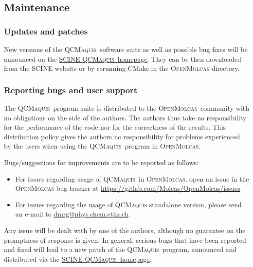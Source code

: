 \documentclass[bibliography=totoc,12pt,a4paper]{scrartcl}
\newcommand{\mol}{\textsc{OpenMolcas}}
\newcommand{\qcm}{\textsc{QCMaquis}}
\begin{document}
\subsection{Maintenance}\label{sec:maintenance}

\subsubsection{Updates and patches}\label{sec:patches-qcm}

New versions of the \qcm\ software suite as well as possible bug fixes will be announced
on the \href{https://www.scine.ethz.ch/download/qcmaquis}{SCINE \qcm\ homepage}. They can be then downloaded from the SCINE website or by rerunning CMake in the \mol{} directory.

\subsubsection{Reporting bugs and user support}\label{sec:bugs-support}

The \qcm\ program suite is distributed to the \mol\ community with no obligations on the side of the authors.
The authors thus take no responsibility for the performance of the code nor for the correctness of the results.
This distribution policy gives the authors no responsibility for problems experienced by the users when using the \qcm\ program in \mol.

Bugs/suggestions for improvements are to be reported as follows:

\begin{itemize}
  \item For issues regarding usage of \qcm\ in \mol{}, open an issue in the \mol{} bug tracker at
    \url{https://gitlab.com/Molcas/OpenMolcas/issues}
  \item For issues regarding the usage of \qcm{} standalone version, please send an e-mail to \href{mailto:dmrg@phys.chem.ethz.ch}{dmrg@phys.chem.ethz.ch}.
\end{itemize}

Any issue will be dealt with by one of the authors, although no guarantee on the promptness of response is given.
In general, serious bugs that have been reported and fixed will lead to a new patch of the \qcm\ program,
announced and distributed via the \href{https://www.scine.ethz.ch/download/qcmaquis}{SCINE \qcm\ homepage}.
\end{document}

